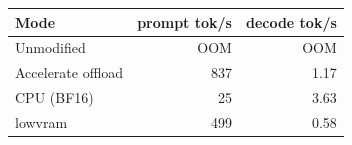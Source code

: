 \begin{tabular}{lrr}
\toprule
Mode & prompt tok/s & decode tok/s \\
\midrule
Unmodified & OOM & OOM \\
Accelerate offload & 837 & 1.17 \\
CPU (BF16) & 25 & 3.63 \\
lowvram & 499 & 0.58 \\
\bottomrule
\end{tabular}
